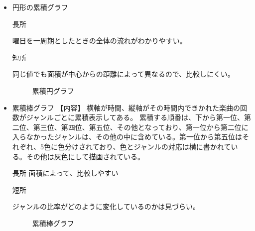 \documentclass{jsarticle}
\begin{document}
\begin{itemize}


\item
円形の累積グラフ

長所

曜日を一周期としたときの全体の流れがわかりやすい。

短所

同じ値でも面積が中心からの距離によって異なるので、比較しにくい。


\begin{figure}[htbp]
\begin{center}
\caption{累積円グラフ}
\end{center}
\end{figure}



\item
累積棒グラフ
【内容】
横軸が時間、縦軸がその時間内できかれた楽曲の回数がジャンルごとに累積表示してある。
累積する順番は、下から第一位、第二位、第三位、第四位、第五位、その他となっており、第一位から第二位に入らなかったジャンルは、その他の中に含めている。第一位から第五位はそれぞれ、5色に色分けされており、色とジャンルの対応は横に書かれている。その他は灰色にして描画されている。

長所
面積によって、比較しやすい

短所

ジャンルの比率がどのように変化しているのかは見づらい。




\begin{figure}[htbp]
\begin{center}
\caption{累積棒グラフ}
\end{center}
\end{figure}




\end{itemize}
\end{document}
